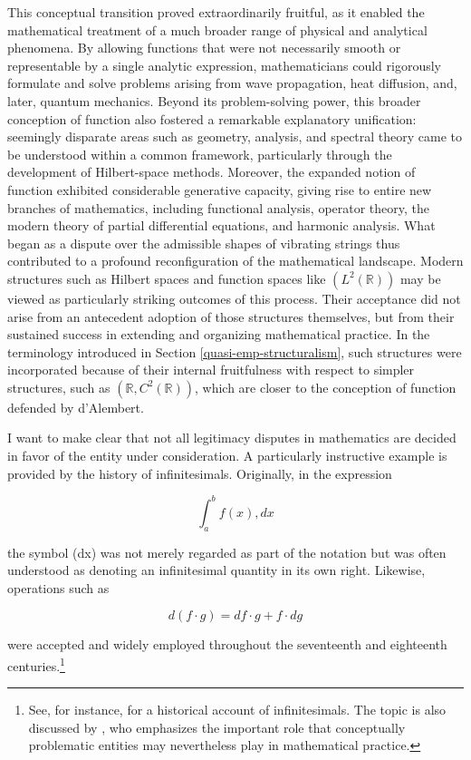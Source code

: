 \documentclass[11pt,a4paper]{article}
\begin{document}
This conceptual transition proved extraordinarily fruitful, as it enabled the mathematical treatment of a much broader range of physical and analytical phenomena. By allowing functions that were not necessarily smooth or representable by a single analytic expression, mathematicians could rigorously formulate and solve problems arising from wave propagation, heat diffusion, and, later, quantum mechanics. Beyond its problem-solving power, this broader conception of function also fostered a remarkable explanatory unification: seemingly disparate areas such as geometry, analysis, and spectral theory came to be understood within a common framework, particularly through the development of Hilbert-space methods. Moreover, the expanded notion of function exhibited considerable generative capacity, giving rise to entire new branches of mathematics, including functional analysis, operator theory, the modern theory of partial differential equations, and harmonic analysis. What began as a dispute over the admissible shapes of vibrating strings thus contributed to a profound reconfiguration of the mathematical landscape. Modern structures such as Hilbert spaces and function spaces like $(L^2(\mathbb R))$ may be viewed as particularly striking outcomes of this process. Their acceptance did not arise from an antecedent adoption of those structures themselves, but from their sustained success in extending and organizing mathematical practice. In the terminology introduced in Section \ref{quasi-emp-structuralism}, such structures were incorporated because of their internal fruitfulness with respect to simpler structures, such as $(\mathbb R,C^2(\mathbb R))$, which are closer to the conception of function defended by d'Alembert.

I want to make clear that not all legitimacy disputes in mathematics are decided in favor of the entity under consideration. A particularly instructive example is provided by the history of infinitesimals. Originally, in the expression

$$\int_a^b f(x),dx$$

the symbol (dx) was not merely regarded as part of the notation but was often understood as denoting an infinitesimal quantity in its own right. Likewise, operations such as

$$d(f \cdot g)=df \cdot g + f \cdot dg$$

were accepted and widely employed throughout the seventeenth and eighteenth centuries.\footnote{See, for instance, \textcite{Bos1974} for a historical account of infinitesimals. The topic is also discussed by \textcite{Lakatos1976}, who emphasizes the important role that conceptually problematic entities may nevertheless play in mathematical practice. }
\end{document}

